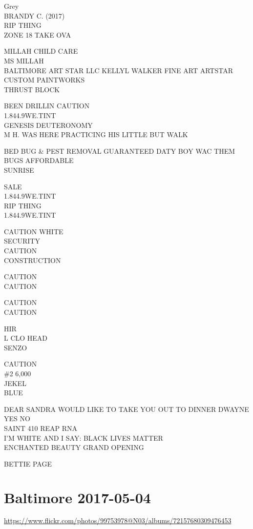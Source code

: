 \documentclass[10pt,letterpaper]{article}
\begin{document}
Grey\\
BRANDY C. (2017)\\
RIP THING\\
ZONE 18 TAKE OVA

MILLAH CHILD CARE\\
MS MILLAH\\
BALTIMORE ART STAR LLC KELLYL WALKER FINE ART ARTSTAR CUSTOM PAINTWORKS\\
THRUST BLOCK

BEEN DRILLIN CAUTION\\
1.844.9WE.TINT\\
GENESIS DEUTERONOMY\\
M H. WAS HERE PRACTICING HIS LITTLE BUT WALK

BED BUG \& PEST REMOVAL GUARANTEED DATY BOY WAC THEM BUGS AFFORDABLE\\
SUNRISE

SALE\\
1.844.9WE.TINT\\
RIP THING\\
1.844.9WE.TINT

CAUTION WHITE\\
SECURITY\\
CAUTION\\
CONSTRUCTION

CAUTION\\
CAUTION

CAUTION\\
CAUTION

HIR\\
L CLO HEAD\\
SENZO

CAUTION\\
\#2 6,000\\
JEKEL\\
BLUE

DEAR SANDRA WOULD LIKE TO TAKE YOU OUT TO DINNER DWAYNE YES NO\\
SAINT 410 REAP RNA\\
I'M WHITE AND I SAY: BLACK LIVES MATTER\\
ENCHANTED BEAUTY GRAND OPENING

BETTIE PAGE
\

\section*{Baltimore 2017-05-04}

\url{https://www.flickr.com/photos/99753978@N03/albums/72157680309476453}
\end{document}
